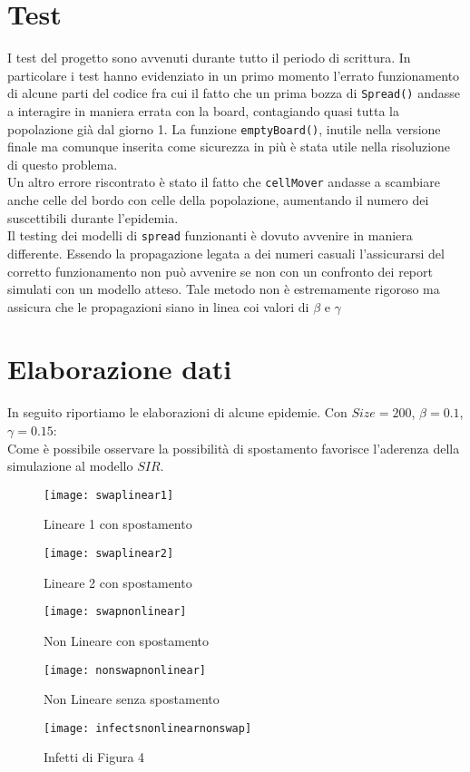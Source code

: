 \documentclass[a4paper]{article}
\begin{document}
\section{Test}
I test del progetto sono avvenuti durante tutto il periodo di scrittura. In particolare i test hanno evidenziato in un primo momento l'errato funzionamento di alcune parti del codice fra cui il fatto che un prima bozza di \texttt{Spread()} andasse a interagire in maniera errata con la board, contagiando quasi tutta la popolazione già dal giorno 1. La funzione \texttt{emptyBoard()}, inutile nella versione finale ma comunque inserita come sicurezza in più è stata utile nella risoluzione di questo problema.\\
 Un altro errore riscontrato è stato il fatto che \texttt{cellMover} andasse a scambiare anche celle del bordo con celle della popolazione, aumentando il numero dei suscettibili durante l'epidemia.\\
 Il testing dei modelli di \texttt{spread} funzionanti è dovuto avvenire in maniera differente. Essendo la propagazione legata a dei numeri casuali l'assicurarsi del corretto funzionamento non può avvenire se non con un confronto dei report simulati con un modello atteso. Tale metodo non è estremamente rigoroso ma assicura che le propagazioni siano in linea coi valori di $\beta$ e $\gamma$
 
\section{Elaborazione dati}
 In seguito riportiamo le elaborazioni di alcune epidemie. Con $Size = 200$, $\beta = 0.1$, $\gamma = 0.15$:\\
 Come è possibile osservare la possibilità di spostamento favorisce l'aderenza della simulazione al modello $SIR$.\\
\begin{figure}[!h]
	\centering
	\texttt{[image: swaplinear1]}
	\caption[Lineare 1 con spostamento]{Lineare 1 con spostamento}
	\label{fig:swaplinear1}
\end{figure}
\begin{figure}
	\centering
	\texttt{[image: swaplinear2]}
	\caption[Lineare 2 con spostamento]{Lineare 2 con spostamento}
	\label{fig:swaplinear1}
\end{figure}
\begin{figure}
	\centering
	\texttt{[image: swapnonlinear]}
	\caption[nonLineare  con spostamento]{Non Lineare con spostamento}
	\label{fig:swaplinear1}
\end{figure}
\begin{figure}
	\centering
	\texttt{[image: nonswapnonlinear]}
	\caption[nonLineare noSpostamento]{Non Lineare senza spostamento}
	\label{fig:swaplinear1}
\end{figure}
\begin{figure}
	\centering
	\texttt{[image: infectsnonlinearnonswap]}
	\caption[Infetti nonLineare noSpostamento]{Infetti di Figura 4}
	\label{fig:swaplinear1}
\end{figure}
\end{document}
